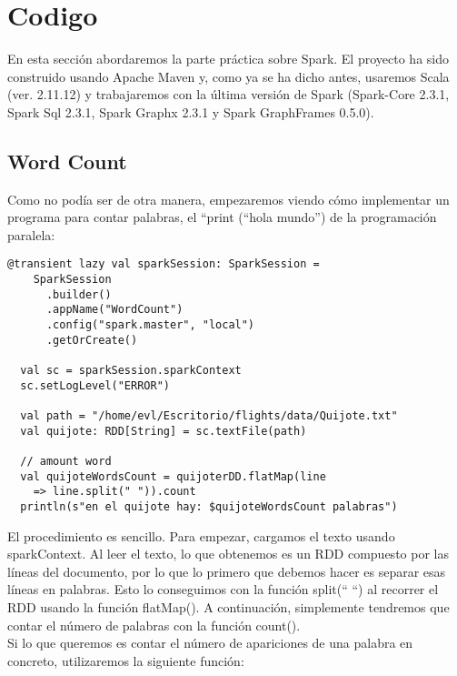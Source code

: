 \chapter{Codigo}

En esta sección abordaremos la parte práctica sobre Spark. El proyecto ha sido construido usando Apache Maven y, como ya se ha dicho antes, usaremos Scala (ver. 2.11.12) y trabajaremos con la última versión de Spark (Spark-Core 2.3.1, Spark Sql 2.3.1, Spark Graphx 2.3.1 y Spark GraphFrames 0.5.0).\\

\section{Word Count}


Como no podía ser de otra manera, empezaremos viendo cómo implementar un programa para contar palabras, el “print (“hola mundo”) de la programación paralela:\\

\begin{lstlisting}[frame=single]
  @transient lazy val sparkSession: SparkSession =
    SparkSession
      .builder()
      .appName("WordCount")
      .config("spark.master", "local")
      .getOrCreate()
      
  val sc = sparkSession.sparkContext
  sc.setLogLevel("ERROR")

  val path = "/home/evl/Escritorio/flights/data/Quijote.txt"
  val quijote: RDD[String] = sc.textFile(path)

  // amount word
  val quijoteWordsCount = quijoterDD.flatMap(line 
  	=> line.split(" ")).count
  println(s"en el quijote hay: $quijoteWordsCount palabras")

\end{lstlisting}

El procedimiento es sencillo. Para empezar, cargamos el texto usando sparkContext. Al leer el texto, lo que obtenemos es un RDD compuesto por las líneas del documento, por lo que lo primero que debemos hacer es separar esas líneas en palabras. Esto lo conseguimos con la función split(“ “) al recorrer el RDD usando la función flatMap(). A continuación, simplemente tendremos que contar el número de palabras con la función count().\\

Si lo que queremos es contar el número de apariciones de una palabra en concreto, utilizaremos la siguiente función:\\

